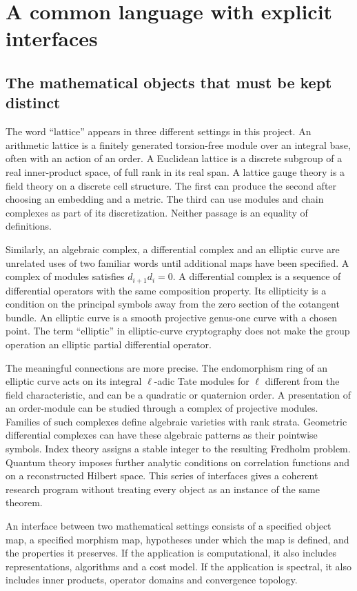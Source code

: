 \chapter{A common language with explicit interfaces}
\label{ch:interfaces}
\section{The mathematical objects that must be kept distinct}
The word ``lattice'' appears in three different settings in this project. An arithmetic lattice is a finitely generated torsion-free module over an integral base, often with an action of an order. A Euclidean lattice is a discrete subgroup of a real inner-product space, of full rank in its real span. A lattice gauge theory is a field theory on a discrete cell structure. The first can produce the second after choosing an embedding and a metric. The third can use modules and chain complexes as part of its discretization. Neither passage is an equality of definitions.

Similarly, an algebraic complex, a differential complex and an elliptic curve are unrelated uses of two familiar words until additional maps have been specified. A complex of modules satisfies $d_{i+1}d_i=0$. A differential complex is a sequence of differential operators with the same composition property. Its ellipticity is a condition on the principal symbols away from the zero section of the cotangent bundle. An elliptic curve is a smooth projective genus-one curve with a chosen point. The term ``elliptic'' in elliptic-curve cryptography does not make the group operation an elliptic partial differential operator.

The meaningful connections are more precise. The endomorphism ring of an elliptic curve acts on its integral $\ell$-adic Tate modules for $\ell$ different from the field characteristic, and can be a quadratic or quaternion order. A presentation of an order-module can be studied through a complex of projective modules. Families of such complexes define algebraic varieties with rank strata. Geometric differential complexes can have these algebraic patterns as their pointwise symbols. Index theory assigns a stable integer to the resulting Fredholm problem. Quantum theory imposes further analytic conditions on correlation functions and on a reconstructed Hilbert space. This series of interfaces gives a coherent research program without treating every object as an instance of the same theorem.

\begin{definition}
An interface between two mathematical settings consists of a specified object map, a specified morphism map, hypotheses under which the map is defined, and the properties it preserves. If the application is computational, it also includes representations, algorithms and a cost model. If the application is spectral, it also includes inner products, operator domains and convergence topology.
\end{definition}

